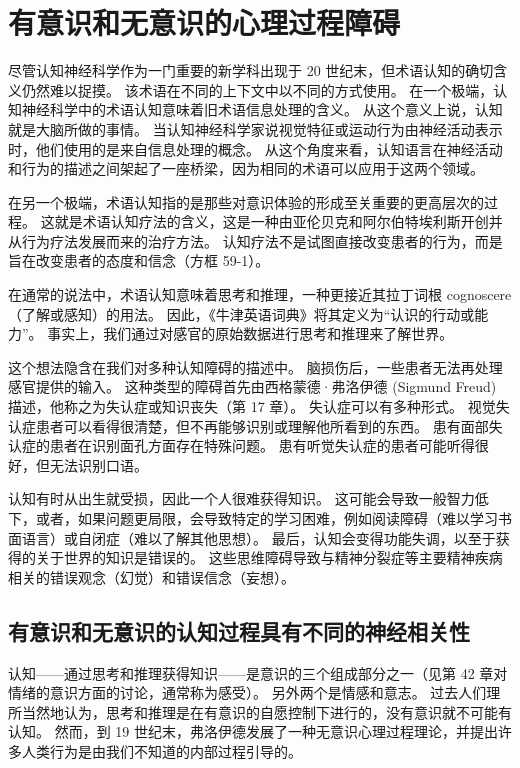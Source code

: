 \chapter{有意识和无意识的心理过程障碍} \label{chap:chap59}

尽管认知神经科学作为一门重要的新学科出现于 20 世纪末，但术语认知的确切含义仍然难以捉摸。 该术语在不同的上下文中以不同的方式使用。 在一个极端，认知神经科学中的术语认知意味着旧术语信息处理的含义。 从这个意义上说，认知就是大脑所做的事情。 当认知神经科学家说视觉特征或运动行为由神经活动表示时，他们使用的是来自信息处理的概念。 从这个角度来看，认知语言在神经活动和行为的描述之间架起了一座桥梁，因为相同的术语可以应用于这两个领域。

在另一个极端，术语认知指的是那些对意识体验的形成至关重要的更高层次的过程。 这就是术语认知疗法的含义，这是一种由亚伦贝克和阿尔伯特埃利斯开创并从行为疗法发展而来的治疗方法。 认知疗法不是试图直接改变患者的行为，而是旨在改变患者的态度和信念（方框 59-1）。

在通常的说法中，术语认知意味着思考和推理，一种更接近其拉丁词根 cognoscere（了解或感知）的用法。 因此，《牛津英语词典》将其定义为“认识的行动或能力”。 事实上，我们通过对感官的原始数据进行思考和推理来了解世界。

这个想法隐含在我们对多种认知障碍的描述中。 脑损伤后，一些患者无法再处理感官提供的输入。 这种类型的障碍首先由西格蒙德·弗洛伊德 (Sigmund Freud) 描述，他称之为失认症或知识丧失（第 17 章）。 失认症可以有多种形式。 视觉失认症患者可以看得很清楚，但不再能够识别或理解他所看到的东西。 患有面部失认症的患者在识别面孔方面存在特殊问题。 患有听觉失认症的患者可能听得很好，但无法识别口语。

认知有时从出生就受损，因此一个人很难获得知识。 这可能会导致一般智力低下，或者，如果问题更局限，会导致特定的学习困难，例如阅读障碍（难以学习书面语言）或自闭症（难以了解其他思想）。 最后，认知会变得功能失调，以至于获得的关于世界的知识是错误的。 这些思维障碍导致与精神分裂症等主要精神疾病相关的错误观念（幻觉）和错误信念（妄想）。


\section{有意识和无意识的认知过程具有不同的神经相关性}
认知——通过思考和推理获得知识——是意识的三个组成部分之一（见第 42 章对情绪的意识方面的讨论，通常称为感受）。 另外两个是情感和意志。 过去人们理所当然地认为，思考和推理是在有意识的自愿控制下进行的，没有意识就不可能有认知。 然而，到 19 世纪末，弗洛伊德发展了一种无意识心理过程理论，并提出许多人类行为是由我们不知道的内部过程引导的。

